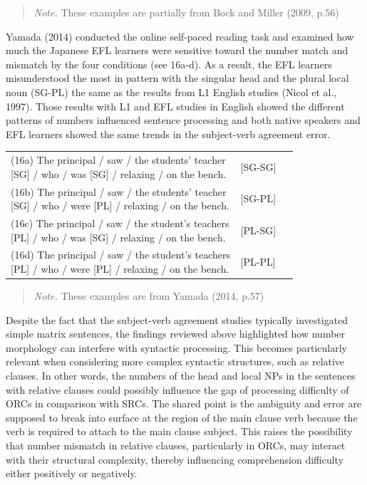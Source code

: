 \documentclass[
]{article}
\begin{document}
\vspace{1em}

\noindent
\begin{quote}
\small
\textit{Note.} These examples are partially from Bock and Miller (2009, p.56)
\end{quote}

\vspace{1em}

Yamada (2014) conducted the online self-paced reading task and examined
how much the Japanese EFL learners were sensitive toward the number
match and mismatch by the four conditions (see 16a-d). As a result, the
EFL learners misunderstood the most in pattern with the singular head
and the plural local noun (SG-PL) the same as the results from L1
English studies (Nicol et al., 1997). Those results with L1 and EFL
studies in English showed the different patterns of numbers influenced
sentence processing and both native speakers and EFL learners showed the
same trends in the subject-verb agreement error.

\vspace{1em}

\noindent
\begin{tabular}{@{}p{0.8\linewidth} p{2.5cm}@{}}
(16a) The principal / saw / the students’ teacher [SG] / who / was [SG] / relaxing / on the bench. & \hfill [SG-SG] \\
(16b) The principal / saw / the students’ teacher [SG] / who / were [PL] / relaxing / on the bench. & \hfill [SG-PL] \\
(16c) The principal / saw / the student’s teachers [PL] / who / was [SG] / relaxing / on the bench. & \hfill [PL-SG] \\
(16d) The principal / saw / the student’s teachers [PL] / who / were [PL] / relaxing / on the bench. & \hfill [PL-PL] \\
\end{tabular}

\vspace{1em}

\noindent
\begin{quote}
\small
\textit{Note.} These examples are from Yamada (2014, p.57)
\end{quote}

\vspace{1em}

Despite the fact that the subject-verb agreement studies typically
investigated simple matrix sentences, the findings reviewed above
highlighted how number morphology can interfere with syntactic
processing. This becomes particularly relevant when considering more
complex syntactic structures, such as relative clauses. In other words,
the numbers of the head and local NPs in the sentences with relative
clauses could possibly influence the gap of processing difficulty of
ORCs in comparison with SRCs. The shared point is the ambiguity and
error are supposed to break into surface at the region of the main
clause verb because the verb is required to attach to the main clause
subject. This raises the possibility that number mismatch in relative
clauses, particularly in ORCs, may interact with their structural
complexity, thereby influencing comprehension difficulty either
positively or negatively.
\end{document}
